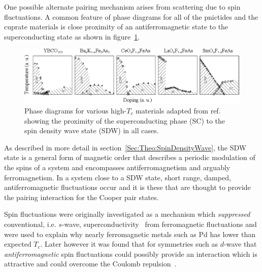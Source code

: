One possible alternate pairing mechanism arises from scattering due to spin fluctuations. A common feature of phase diagrams for all of the pnictides and the cuprate materials is close proximity of an antiferromagnetic state to the superconducting state as shown in figure~\ref{Fig:Intro:PhaseDiagrams}.
\begin{figure}[htbp]
    \begin{center}
        \includegraphics[scale=1.0]{Chapter-Introduction/Figures/PhaseDiagrams/PhaseDiagrams}
        \caption{Phase diagrams for various high-$T_c$ materials adapted from ref.~\cite{Uemura2009} showing the proximity of the superconducting phase (SC) to the spin density wave state (SDW) in all cases.}
        \label{Fig:Intro:PhaseDiagrams}
    \end{center}
\end{figure}
As described in more detail in section~\ref{Sec:Theo:SpinDensityWave}, the \ac{SDW} state is a general form of magnetic order that describes a periodic modulation of the spins of a system and encompasses antiferromagnetism and arguably ferromagnetism. In a system close to a \ac{SDW} state, short range, damped, antiferromagnetic fluctuations occur and it is these that are thought to provide the pairing interaction for the Cooper pair states.

Spin fluctuations were originally investigated as a mechanism which \emph{suppressed} conventional, i.e. $s$-wave, superconductivity~\cite{Berk1966} from ferromagnetic fluctuations and were used to explain why nearly ferromagnetic metals such as Pd has lower than expected $T_c$. Later however it was found that for symmetries such as $d$-wave that \emph{antiferromagnetic} spin fluctuations could possibly provide an interaction which is attractive and could overcome the Coulomb repulsion~\cite{Scalapino1995}.

